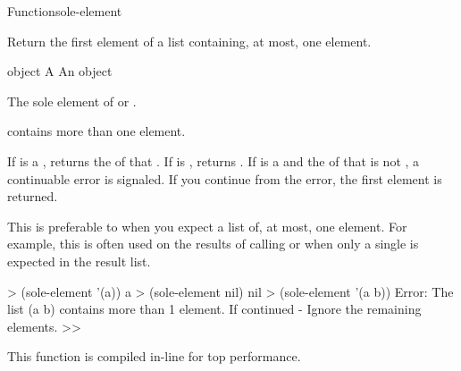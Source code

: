 \documentclass[10pt,twoside,english,pdftex]{article}
\newcommand{\inline}{This function is compiled in-line for top performance.}
\begin{document}
\begin{functiondoc}{Function}{sole-element}{
    }
%
%
  
\fnsyntax

\fnpurpose Return the first element of a list containing, at most, one element.

\fnpackage {}

\fnmodule {}

\fnargs
\begin{args}{object}
\arg[list] A 
\arg[element] An object
\end{args}

\fnreturns The sole element of  or \nil.

\fnerrors
{} contains more than one element.

\fndescription If  is a , 
returns the  of that . If  is \nil,
 returns \nil.  If  is a 
and the  of that  is not \nil, a continuable error is
signaled.  If you continue from the error, the first element is returned.

%
%
This  is preferable to  when you
expect a list of, at most, one element.  For example, this  is
often used on the results of calling
 or
 when only a single
 is expected in the result list.

\fnexamples
%
\W\supp
\begin{example}
  > (sole-element '(a))
  a
  > (sole-element nil)
  nil\goodpagebreak
  > (sole-element '(a b))
  Error: The list (a b) contains more than 1 element.
         If continued - Ignore the remaining elements.
  >>
\end{example}

\fnnote \inline

\end{functiondoc}

\end{document}
